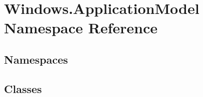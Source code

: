 \hypertarget{namespace_windows_1_1_application_model}{}\section{Windows.\+Application\+Model Namespace Reference}
\label{namespace_windows_1_1_application_model}
\subsection*{Namespaces}
\begin{DoxyCompactItemize}
\end{DoxyCompactItemize}
\subsection*{Classes}
